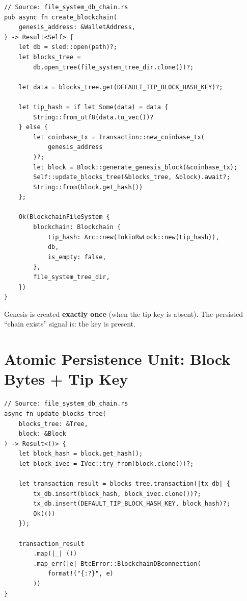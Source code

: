 \begin{listing}[H]
\caption{}
\label{lst:ch09-3-11}
\begin{verbatim}
// Source: file_system_db_chain.rs
pub async fn create_blockchain(
    genesis_address: &WalletAddress,
) -> Result<Self> {
    let db = sled::open(path)?;
    let blocks_tree =
        db.open_tree(file_system_tree_dir.clone())?;

    let data = blocks_tree.get(DEFAULT_TIP_BLOCK_HASH_KEY)?;

    let tip_hash = if let Some(data) = data {
        String::from_utf8(data.to_vec())?
    } else {
        let coinbase_tx = Transaction::new_coinbase_tx(
            genesis_address
        )?;
        let block = Block::generate_genesis_block(&coinbase_tx);
        Self::update_blocks_tree(&blocks_tree, &block).await?;
        String::from(block.get_hash())
    };

    Ok(BlockchainFileSystem {
        blockchain: Blockchain {
            tip_hash: Arc::new(TokioRwLock::new(tip_hash)),
            db,
            is_empty: false,
        },
        file_system_tree_dir,
    })
}
\end{verbatim}
\end{listing}

\begin{notebox}
Genesis is created \textbf{exactly once} (when the tip key is absent). The persisted ``chain exists'' signal is: the  key is present.
\end{notebox}

\section{Atomic Persistence Unit: Block Bytes + Tip Key}
\label{sec:ch09-3-atomic-unit}

\begin{listing}[H]
\caption{Atomic persistence: write block and tip together}
\label{lst:ch09-3-12}
\begin{verbatim}
// Source: file_system_db_chain.rs
async fn update_blocks_tree(
    blocks_tree: &Tree,
    block: &Block
) -> Result<()> {
    let block_hash = block.get_hash();
    let block_ivec = IVec::try_from(block.clone())?;

    let transaction_result = blocks_tree.transaction(|tx_db| {
        tx_db.insert(block_hash, block_ivec.clone())?;
        tx_db.insert(DEFAULT_TIP_BLOCK_HASH_KEY, block_hash)?;
        Ok(())
    });

    transaction_result
        .map(|_| ())
        .map_err(|e| BtcError::BlockchainDBconnection(
            format!("{:?}", e)
        ))
}
\end{verbatim}
\end{listing}


